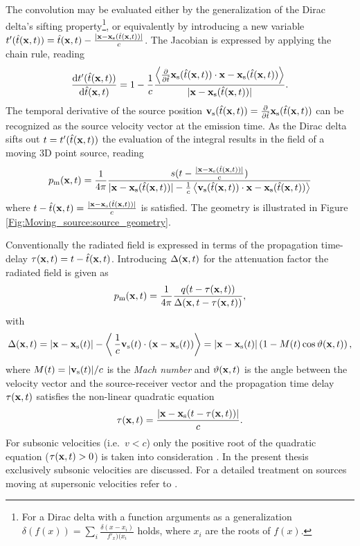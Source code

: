 The convolution may be evaluated either by the generalization of the Dirac delta's sifting property\footnote{
For a Dirac delta with a function arguments as a generalization $\delta(f(x)) = \sum_{i}\frac{\delta(x-x_i)}{f'_{x})(x_i}$ holds, where $x_i$ are the roots of $f(x)$.}, 
or equivalently by introducing a new variable $t'(\hat{t}(\mathbf{x},t)) = \hat{t}(\mathbf{x},t) - \frac{|\mathbf{x}-\mathbf{x}_{\mathrm{s}}(\hat{t}(\mathbf{x},t))|}{c}$.
The Jacobian is expressed by applying the chain rule, reading 
\begin{equation}
\frac{\mathrm{d} t'(\hat{t}(\mathbf{x},t))}{\mathrm{d} \hat{t}(\mathbf{x},t)} = 1 - \frac{1}{c} \frac{\left< \frac{\partial}{\partial \hat{t}}\mathbf{x}_{\mathrm{s}}(\hat{t}(\mathbf{x},t)) \cdot \mathbf{x}-\mathbf{x}_{\mathrm{s}}(\hat{t}(\mathbf{x},t))\right> }{|\mathbf{x}-\mathbf{x}_{\mathrm{s}}(\hat{t}(\mathbf{x},t))|}.
\end{equation}
The temporal derivative of the source position $\mathbf{v}_{\mathrm{s}}(\hat{t}(\mathbf{x},t)) = \frac{\partial}{\partial \hat{t}}\mathbf{x}_{\mathrm{s}}(\hat{t}(\mathbf{x},t))$ can be recognized as the source velocity vector at the emission time.
As the Dirac delta sifts out $t = t'(\hat{t}(\mathbf{x},t))$ the evaluation of the integral results in the field of a moving 3D point source, reading
\begin{equation}
p_{\mathrm{m}}(\mathbf{x},t) =
\frac{1}{4\pi} \frac{ s(t - \frac{|\mathbf{x}-\mathbf{x}_{\mathrm{s}}(\hat{t}(\mathbf{x},t))|}{c} ) }{|\mathbf{x}-\mathbf{x}_{\mathrm{s}}(\hat{t}(\mathbf{x},t))| - \frac{1}{c}\left< \mathbf{v}_{\mathrm{s}}(\hat{t}(\mathbf{x},t)) \cdot \mathbf{x}-\mathbf{x}_{\mathrm{s}}(\hat{t}(\mathbf{x},t))\right> }
\end{equation}
where $t - \hat{t}(\mathbf{x},t) = \frac{|\mathbf{x}-\mathbf{x}_{\mathrm{s}}(\hat{t}(\mathbf{x},t))|}{c}$ is satisfied.
The geometry is illustrated in Figure \ref{Fig:Moving_source:source_geometry}.

Conventionally the radiated field is expressed in terms of the propagation time-delay $\tau(\mathbf{x},t) = t - \hat{t}(\mathbf{x},t)$.
Introducing $\Delta(\mathbf{x},t)$ for the attenuation factor the radiated field is given as
\begin{equation}
p_{\mathrm{m}}(\mathbf{x},t) = \frac{1}{4\pi}\frac{q( t - \tau( \mathbf{x},t ) )}{\Delta(\mathbf{x},t-\tau( \mathbf{x}, t ))},
\label{eq:moving_source_field}
\end{equation}
with
\begin{equation}
\Delta( \mathbf{x},t ) = |\mathbf{x} - \mathbf{x}_{\mathrm{s}}(t)| - \left<\, \frac{1}{c}\mathbf{v}_{\mathrm{s}}(t) \cdot (\mathbf{x} - \mathbf{x}_{\mathrm{s}}(t)) \right> 
 =  |\mathbf{x} - \mathbf{x}_{\mathrm{s}}(t)|\left( 1 - M(t) \cos \vartheta(\mathbf{x},t) \right),
\label{eq:delta}
\end{equation}
where $M(t) = |\mathbf{v}_{\mathrm{s}}(t)|/c$ is the \emph{Mach number} and $\vartheta(\mathbf{x},t)$ is the angle between the velocity vector and the source-receiver vector and the propagation time delay $\tau(\mathbf{x},t)$ satisfies the non-linear quadratic equation
%
\begin{equation}
\tau(\mathbf{x},t) =  \frac{| \mathbf{x} - \mathbf{x}_{\mathrm{s}}( t - \tau(\mathbf{x},t)) |  }{c}.
\label{eq:tau}
\end{equation}
%
For subsonic velocities (i.e.\ $v<c$) only the positive root of the quadratic equation ($\tau(\mathbf{x},t)>0$) is taken into consideration \cite{deHoop2005}. 
In the present thesis exclusively subsonic velocities are discussed.
For a detailed treatment on sources moving at supersonic velocities refer to \cite{Ahrens2012, Ahrens2008moving_b}.

